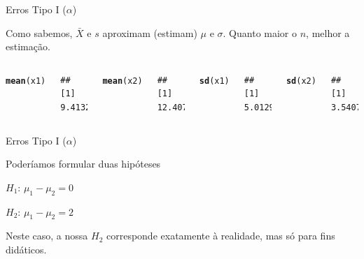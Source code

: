 \documentclass{beamer}\usepackage[]{graphicx}\usepackage[]{color}
\makeatletter
\newcommand{\hlstd}[1]{\textcolor[rgb]{0.345,0.345,0.345}{#1}}%
\newcommand{\hlkwd}[1]{\textcolor[rgb]{0.737,0.353,0.396}{\textbf{#1}}}%
\newenvironment{kframe}{%
 \def\at@end@of@kframe{}%
 \ifinner\ifhmode%
  \def\at@end@of@kframe{\end{minipage}}%
  \begin{minipage}{\columnwidth}%
 \fi\fi%
 \def\FrameCommand##1{\hskip\@totalleftmargin \hskip-\fboxsep
 \colorbox{shadecolor}{##1}\hskip-\fboxsep
     \hskip-\linewidth \hskip-\@totalleftmargin \hskip\columnwidth}%
 \MakeFramed {\advance\hsize-\width
   \@totalleftmargin\z@ \linewidth\hsize
   \@setminipage}}%
 {\par\unskip\endMakeFramed%
 \at@end@of@kframe}
\newenvironment{knitrout}{}{} %
\renewenvironment{knitrout}{\setlength{\topsep}{0mm}}{}
\makeatother
\begin{document}
\begin{frame}[fragile]{Erros Tipo I ($\alpha$)}


Como sabemos, $\bar{X}$ e $s$ aproximam (estimam) $\mu$ e $\sigma$. Quanto maior o $n$, melhor a estimação.

\vfill

\begin{columns}[c]
\begin{knitrout}\small
{}\color{fgcolor}\begin{kframe}
\begin{alltt}
\hlkwd{mean}\hlstd{(x1)}
\end{alltt}
\begin{verbatim}
## [1] 9.413282
\end{verbatim}
\begin{alltt}
\hlkwd{mean}\hlstd{(x2)}
\end{alltt}
\begin{verbatim}
## [1] 12.40707
\end{verbatim}
\end{kframe}
\end{knitrout}

\begin{knitrout}\small
{}\color{fgcolor}\begin{kframe}
\begin{alltt}
\hlkwd{sd}\hlstd{(x1)}
\end{alltt}
\begin{verbatim}
## [1] 5.012927
\end{verbatim}
\begin{alltt}
\hlkwd{sd}\hlstd{(x2)}
\end{alltt}
\begin{verbatim}
## [1] 3.540709
\end{verbatim}
\end{kframe}
\end{knitrout}

\end{columns}

\end{frame}


\begin{frame}{Erros Tipo I ($\alpha$)}

Poderíamos formular duas hipóteses
\vfill

$H_1$: $\mu_1 - \mu_2 = 0$

$H_2$: $\mu_1 - \mu_2 = 2$

\vfill

Neste caso, a nossa $H_2$ corresponde exatamente à realidade, mas só para fins didáticos.

\end{frame}
\end{document}
